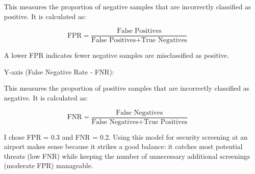 \documentclass[12pt]{article}
\begin{document}
\begin{enumerate}
This measures the proportion of negative samples that are incorrectly classified as positive. It is calculated as:

\[
\text{FPR} = \frac{\text{False Positives}}{\text{False Positives} + \text{True Negatives}}
\]

A lower FPR indicates fewer negative samples are misclassified as positive.

Y-axis (False Negative Rate - FNR):

This measures the proportion of positive samples that are incorrectly classified as negative. It is calculated as:

\[
\text{FNR} = \frac{\text{False Negatives}}{\text{False Negatives} + \text{True Positives}}
\]


I chose FPR = 0.3 and FNR = 0.2. Using this model for security screening at an airport makes sense because it strikes a good balance: it catches most potential threats (low FNR) while keeping the number of unnecessary additional screenings (moderate FPR) manageable.

\end{enumerate}



\end{document}
